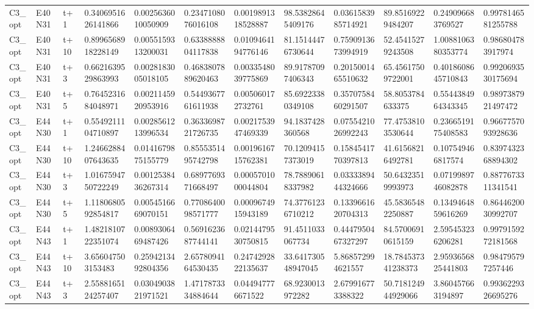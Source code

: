 \begin{landscape}
\begin{longtable}{llllllllllll}
C3\_opt & E40N31 & t+1 & 0.3406951626141866 & 0.0025636010050909 & 0.2347108076016108 & 0.0019891318528887 & 98.53828645409176 & 0.0361583985714921 & 89.85169229484207 & 0.249096683769527 & 0.9978146581255788 \\
C3\_opt & E40N31 & t+10 & 0.8996568918228149 & 0.0055159313200031 & 0.6338888804117838 & 0.0109464194776146 & 81.15144476730644 & 0.7590913673994919 & 52.45415279243508 & 1.0088106380353774 & 0.986804783917974 \\
C3\_opt & E40N31 & t+3 & 0.6621639529863993 & 0.0028183005018105 & 0.4683807889620463 & 0.0033548039775869 & 89.91787097406343 & 0.2015001465510632 & 65.45617509722001 & 0.4018608645710843 & 0.9920693530175694 \\
C3\_opt & E40N31 & t+5 & 0.7645231684048971 & 0.0021145920953916 & 0.5449367761611938 & 0.005060172732761 & 85.69223380349108 & 0.3570758460291507 & 58.8053784633375 & 0.5544384964343345 & 0.9897387921497472 \\
C3\_opt & E44N30 & t+1 & 0.5549211104710897 & 0.0028561213996534 & 0.3633698721726735 & 0.0021753947469339 & 94.1837428360568 & 0.0755421026992243 & 77.47538103530644 & 0.2366519175408583 & 0.9667757093928636 \\
C3\_opt & E44N30 & t+10 & 1.2466288407643635 & 0.0141679875155779 & 0.8555351495742798 & 0.0019616715762381 & 70.12094157373019 & 0.1584541770397813 & 41.61568216492781 & 0.107549466817574 & 0.8397432368894302 \\
C3\_opt & E44N30 & t+3 & 1.0167594750722249 & 0.0012538436267314 & 0.6897769371668497 & 0.0005701000044804 & 78.78890618337982 & 0.0333389444324666 & 50.64323519993973 & 0.0719989746082878 & 0.8877673311341541 \\
C3\_opt & E44N30 & t+5 & 1.1180680592854817 & 0.0054516669070151 & 0.7708640098571777 & 0.0009674915943189 & 74.37761236710212 & 0.1339661620704313 & 45.58365482250887 & 0.1349464859616269 & 0.8644620030992707 \\
C3\_opt & E44N43 & t+1 & 1.4821810722351074 & 0.0089306469487426 & 0.5691623687744141 & 0.0214479530750815 & 91.4511033067734 & 0.4447950467327297 & 84.57006910615159 & 2.595453236206281 & 0.9979159272181568 \\
C3\_opt & E44N43 & t+10 & 3.656047503153483 & 0.2594213492804356 & 2.6578094164530435 & 0.2474292822135637 & 33.641730548947045 & 5.868572994621557 & 18.784537341238373 & 2.9593656825441803 & 0.984795797257446 \\
C3\_opt & E44N43 & t+3 & 2.5588165124257407 & 0.0304903821971521 & 1.4717873334884644 & 0.044947776671522 & 68.9230013972282 & 2.679916773388322 & 50.718124944929066 & 3.860457663194897 & 0.9936229326695276 \\

\end{longtable}
\end{landscape}
